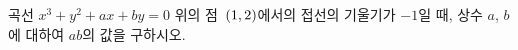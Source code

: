 곡선 $x^3+y^2+ax+by=0$ 위의 점~$(1{,}\mkern3mu\mathopen{}2)$에서의 접선의 기울기가 $-1$일 때, 상수 $a$, $b$에 대하여 $ab$의 값을 구하시오.
